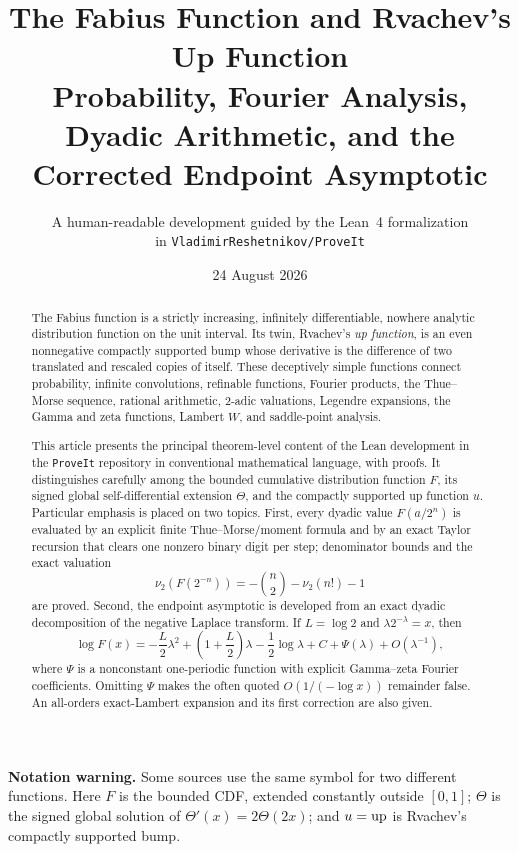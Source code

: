 \documentclass[11pt]{article}
\title{\vspace{-1.3cm}\textbf{The Fabius Function and Rvachev's Up Function}\\[0.4em]
\large Probability, Fourier Analysis, Dyadic Arithmetic, and the Corrected Endpoint Asymptotic}
\author{A human-readable development guided by the Lean~4 formalization\\
\small in \texttt{VladimirReshetnikov/ProveIt}}
\date{24 August 2026}
\theoremstyle{definition}
\theoremstyle{remark}
\begin{document}
\maketitle
\begin{abstract}
The Fabius function is a strictly increasing, infinitely differentiable, nowhere analytic distribution function on the unit interval.  Its twin, Rvachev's \emph{up function}, is an even nonnegative compactly supported bump whose derivative is the difference of two translated and rescaled copies of itself.  These deceptively simple functions connect probability, infinite convolutions, refinable functions, Fourier products, the Thue--Morse sequence, rational arithmetic, $2$-adic valuations, Legendre expansions, the Gamma and zeta functions, Lambert $W$, and saddle-point analysis.

This article presents the principal theorem-level content of the Lean development in the \texttt{ProveIt} repository in conventional mathematical language, with proofs.  It distinguishes carefully among the bounded cumulative distribution function $F$, its signed global self-differential extension $\Theta$, and the compactly supported up function $u$.  Particular emphasis is placed on two topics.  First, every dyadic value $F(a/2^n)$ is evaluated by an explicit finite Thue--Morse/moment formula and by an exact Taylor recursion that clears one nonzero binary digit per step; denominator bounds and the exact valuation
\[
 \nu_2(F(2^{-n}))=-\binom n2-\nu_2(n!)-1
\]
are proved.  Second, the endpoint asymptotic is developed from an exact dyadic decomposition of the negative Laplace transform.  If $L=\log2$ and $\lambda 2^{-\lambda}=x$, then
\[
 \log F(x)=-\frac L2\lambda^2+\left(1+\frac L2\right)\lambda
 -\frac12\log\lambda+C+\Psi(\lambda)+O(\lambda^{-1}),
\]
where $\Psi$ is a nonconstant one-periodic function with explicit Gamma--zeta Fourier coefficients.  Omitting $\Psi$ makes the often quoted $O(1/(-\log x))$ remainder false.  An all-orders exact-Lambert expansion and its first correction are also given.
\end{abstract}
\begin{center}\begin{minipage}{0.93\textwidth}\small
\textbf{Notation warning.}  Some sources use the same symbol for two different functions.  Here $F$ is the bounded CDF, extended constantly outside $[0,1]$; $\Theta$ is the signed global solution of $\Theta'(x)=2\Theta(2x)$; and $u=\operatorname{up}$ is Rvachev's compactly supported bump.
\end{minipage}\end{center}
\tableofcontents\newpage
\end{document}
